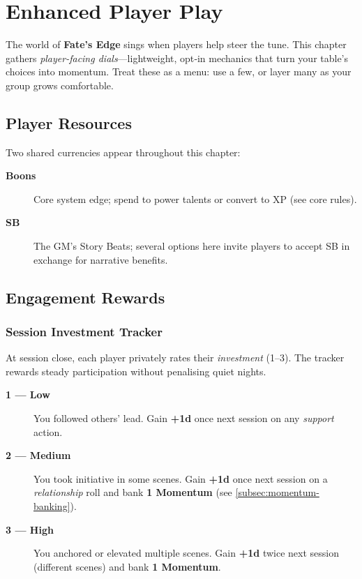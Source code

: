 \chapter{Enhanced Player Play}
\label{ch:enhanced-play}

The world of \textbf{Fate's Edge} sings when players help steer the tune. This chapter gathers \emph{player-facing dials}—lightweight, opt‑in mechanics that turn your table's choices into momentum. Treat these as a menu: use a few, or layer many as your group grows comfortable.

\section{Player Resources}

Two shared currencies appear throughout this chapter:
\begin{description}
  \item[\textbf{Boons}] Core system edge; spend to power talents or convert to XP (see core rules).
  \item[\textbf{SB}] The GM's Story Beats; several options here invite players to accept SB in exchange for narrative benefits.
\end{description}

\section{Engagement Rewards}

\subsection{Session Investment Tracker}
At session close, each player privately rates their \emph{investment} (1–3). The tracker rewards steady participation without penalising quiet nights.

\begin{description}
  \item[\textbf{1 — Low}] You followed others' lead. Gain \textbf{+1d} once next session on any \emph{support} action.
  \item[\textbf{2 — Medium}] You took initiative in some scenes. Gain \textbf{+1d} once next session on a \emph{relationship} roll and bank \textbf{1 Momentum} (see \ref{subsec:momentum-banking}).
  \item[\textbf{3 — High}] You anchored or elevated multiple scenes. Gain \textbf{+1d} twice next session (different scenes) and bank \textbf{1 Momentum}.
\end{description}

